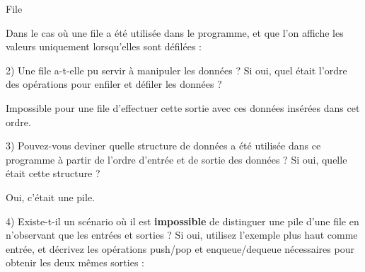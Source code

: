 \documentclass[11pt,a4paper]{article}
\begin{document}
\begin{center}
\begin{table}[ht!]
\begin{minipage}{0.01\textwidth}
  \end{minipage}
  \hfillx
  \begin{minipage}{0.48\textwidth}
    \centering
File

Dans le cas où une file a été utilisée dans le programme, et que l'on affiche les valeurs uniquement lorsqu'elles sont défilées :

\smallskip

\raggedright
2) Une file a-t-elle pu servir à manipuler les données ?
Si oui, quel était l'ordre des opérations pour enfiler et défiler les données ? \phantom{blablabla}

\bigskip
\bigskip

Impossible pour une file d'effectuer cette sortie avec ces données insérées dans cet ordre.



  \end{minipage}
\end{table}

\end{center}


3) Pouvez-vous deviner quelle structure de données a été utilisée dans ce programme à partir de l'ordre d'entrée et de sortie des données ?
Si oui, quelle était cette structure ?

\bigskip

Oui, c'était une pile.

\bigskip


4) Existe-t-il un scénario où il est \textbf{impossible} de distinguer une pile d'une file en n'observant que les entrées et sorties ?
Si oui, utilisez l'exemple plus haut comme entrée, et décrivez les opérations push/pop et enqueue/dequeue nécessaires pour obtenir les deux mêmes sorties :
\end{document}
